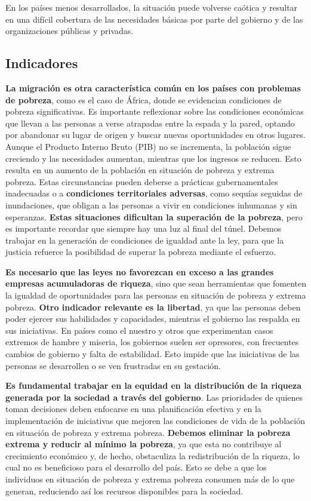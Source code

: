 \documentclass[
  letterpaper,
  DIV=11,
  numbers=noendperiod]{scrartcl}
\begin{document}
En los países menos desarrollados, la situación puede volverse caótica y
resultar en una difícil cobertura de las necesidades básicas por parte
del gobierno y de las organizaciones públicas y privadas.

\hypertarget{indicadores}{%
\subsection{Indicadores}\label{indicadores}}

\textbf{La migración es otra característica común en los países con
problemas de pobreza}, como es el caso de África, donde se evidencian
condiciones de pobreza significativas. Es importante reflexionar sobre
las condiciones económicas que llevan a las personas a verse atrapadas
entre la espada y la pared, optando por abandonar su lugar de origen y
buscar nuevas oportunidades en otros lugares. Aunque el Producto Interno
Bruto (PIB) no se incrementa, la población sigue creciendo y las
necesidades aumentan, mientras que los ingresos se reducen. Esto resulta
en un aumento de la población en situación de pobreza y extrema pobreza.
Estas circunstancias pueden deberse a prácticas gubernamentales
inadecuadas o a \textbf{condiciones territoriales adversas}, como
sequías seguidas de inundaciones, que obligan a las personas a vivir en
condiciones inhumanas y sin esperanzas. \textbf{Estas situaciones
dificultan la superación de la pobreza}, pero es importante recordar que
siempre hay una luz al final del túnel. Debemos trabajar en la
generación de condiciones de igualdad ante la ley, para que la justicia
refuerce la posibilidad de superar la pobreza mediante el esfuerzo.

\textbf{Es necesario que las leyes no favorezcan en exceso a las grandes
empresas acumuladoras de riqueza}, sino que sean herramientas que
fomenten la igualdad de oportunidades para las personas en situación de
pobreza y extrema pobreza. \textbf{Otro indicador relevante es la
libertad}, ya que las personas deben poder ejercer sus habilidades y
capacidades, mientras el gobierno las respalda en sus iniciativas. En
países como el nuestro y otros que experimentan casos extremos de hambre
y miseria, los gobiernos suelen ser opresores, con frecuentes cambios de
gobierno y falta de estabilidad. Esto impide que las iniciativas de las
personas se desarrollen o se ven frustradas en su gestación.

\textbf{Es fundamental trabajar en la equidad en la distribución de la
riqueza generada por la sociedad a través del gobierno}. Las prioridades
de quienes toman decisiones deben enfocarse en una planificación
efectiva y en la implementación de iniciativas que mejoren las
condiciones de vida de la población en situación de pobreza y extrema
pobreza. \textbf{Debemos eliminar la pobreza extrema y reducir al mínimo
la pobreza}, ya que esta no contribuye al crecimiento económico y, de
hecho, obstaculiza la redistribución de la riqueza, lo cual no es
beneficioso para el desarrollo del país. Esto se debe a que los
individuos en situación de pobreza y extrema pobreza consumen más de lo
que generan, reduciendo así los recursos disponibles para la sociedad.
\end{document}

